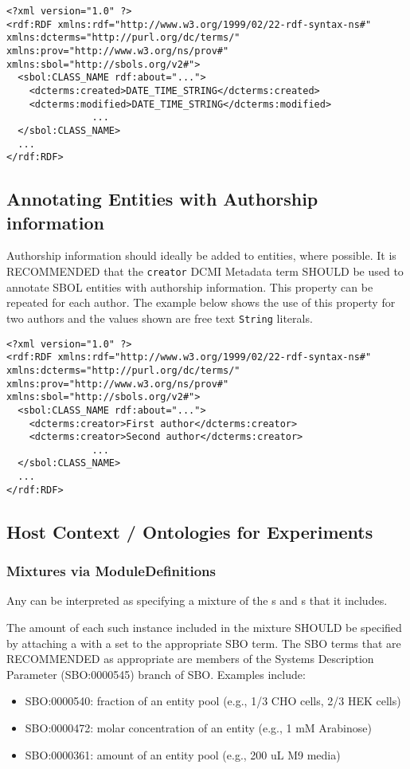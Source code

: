 \begin{lstlisting}
<?xml version="1.0" ?>
<rdf:RDF xmlns:rdf="http://www.w3.org/1999/02/22-rdf-syntax-ns#" xmlns:dcterms="http://purl.org/dc/terms/" xmlns:prov="http://www.w3.org/ns/prov#" xmlns:sbol="http://sbols.org/v2#">
  <sbol:CLASS_NAME rdf:about="...">
    <dcterms:created>DATE_TIME_STRING</dcterms:created>
    <dcterms:modified>DATE_TIME_STRING</dcterms:modified>
               ...
  </sbol:CLASS_NAME>
  ...
</rdf:RDF>
\end{lstlisting}

\subsection{Annotating Entities with Authorship information}\label{sec:Authorship}
Authorship information should ideally be added to  entities, where possible. It is RECOMMENDED that the \texttt{creator} DCMI Metadata term SHOULD be used to annotate SBOL entities with authorship information. This property can be repeated for each author. The example below shows the use of this property for two authors and the values shown are free text \texttt{String} literals.

\begin{lstlisting}
<?xml version="1.0" ?>
<rdf:RDF xmlns:rdf="http://www.w3.org/1999/02/22-rdf-syntax-ns#" xmlns:dcterms="http://purl.org/dc/terms/" xmlns:prov="http://www.w3.org/ns/prov#" xmlns:sbol="http://sbols.org/v2#">
  <sbol:CLASS_NAME rdf:about="...">
    <dcterms:creator>First author</dcterms:creator>
    <dcterms:creator>Second author</dcterms:creator>
               ...
  </sbol:CLASS_NAME>
  ...
</rdf:RDF>
\end{lstlisting}

\subsection{Host Context / Ontologies for Experiments}

\subsubsection{Mixtures via ModuleDefinitions}

Any  can be interpreted as specifying a mixture of the s and s that it includes.

The amount of each such instance included in the mixture SHOULD be specified by attaching a  with a  set to the appropriate SBO term. The SBO terms that are RECOMMENDED as appropriate are members of the Systems Description Parameter (SBO:0000545) branch of SBO. Examples include:
\begin{itemize}
\item SBO:0000540: fraction of an entity pool (e.g., 1/3 CHO cells, 2/3 HEK cells)
\item SBO:0000472: molar concentration of an entity (e.g., 1 mM Arabinose)
\item SBO:0000361: amount of an entity pool (e.g., 200 uL M9 media)
\end{itemize}

